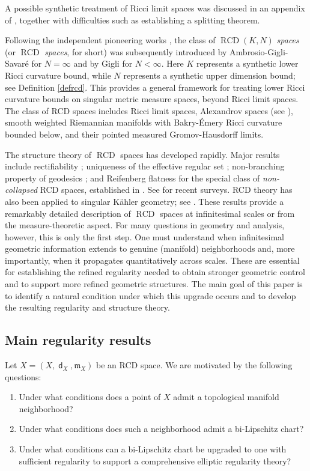 \documentclass[11pt,reqno]{amsart}
\theoremstyle{definition}
\numberwithin{equation}{section}
\newcommand{\meas}{\mathfrak{m}}
\DeclareMathOperator{\dist}{\mathsf{d}}
\DeclareMathOperator{\RCD}{RCD}
\begin{document}
 A possible synthetic treatment of Ricci limit spaces was discussed in an appendix of \cite{CheegerColding1}, together with difficulties such as establishing a splitting theorem.

Following the independent pioneering works \cite{LottVillani,St1, St2}, the class of
$\RCD(K, N)$ \textit{spaces} (or $\RCD$ \textit{spaces}, for short) was subsequently introduced by Ambrosio-Gigli-Savar\'e  \cite{AGSrcd} for $N=\infty$ and by Gigli \cite{Gigli} for $N<\infty$. Here $K$ represents a synthetic lower Ricci curvature bound, while  $N$ represents a synthetic upper dimension bound; see Definition \ref{defrcd}.  This provides a general framework for treating lower Ricci curvature bounds on singular metric measure spaces, beyond Ricci limit spaces. The class of RCD spaces includes Ricci limit spaces, Alexandrov spaces (see \cite{Petrunin, ZZcd}),  smooth weighted Riemannian manifolds with Bakry-\'Emery Ricci curvature bounded below, and their pointed measured Gromov-Hausdorff limits.


The structure theory of $\RCD$ spaces has developed rapidly. Major results include rectifiability \cite{MN};   uniqueness of the effective regular set \cite{BrueSemola};  non-branching property of geodesics \cite{Deng}; and Reifenberg flatness for the special class of \textit{non-collapsed} RCD spaces, established in \cite{DG,KM}. See \cite{ambrosio,Giglisurvey,sturmsurvery} for recent surveys. RCD theory has also been applied to singular K\"ahler geometry; see \cite{S25}.
These results provide a remarkably detailed description of $\RCD$ spaces at infinitesimal scales or from the measure-theoretic aspect.
For many questions in geometry and analysis, however, this is only the first step. One must understand when infinitesimal geometric information extends to genuine (manifold) neighborhoods and, more importantly, when it propagates quantitatively across scales. These are essential for establishing the refined regularity needed to obtain stronger geometric control and to support more refined geometric structures. The main goal of this paper is to identify a natural condition under which this upgrade occurs and to develop the resulting regularity and structure theory.
  





\subsection{Main regularity results}\label{submain}
Let $X=(X,\dist_X,\meas_X)$ be an RCD space. We are motivated by the following questions:
\begin{enumerate}
    \item[(Q1)] Under what conditions does a point of $X$ admit a topological manifold neighborhood?
    \item[(Q2)] Under what conditions does such a neighborhood admit a bi-Lipschitz chart?
    \item[(Q3)] Under what conditions can a bi-Lipschitz chart be upgraded to one with sufficient regularity to support a comprehensive elliptic regularity theory?\end{enumerate}
\end{document}
